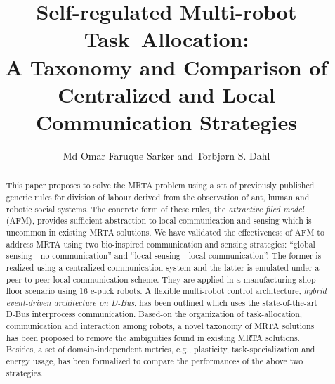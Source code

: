 \documentclass[preprint,12pt]{elsarticle}
\begin{document}
\begin{frontmatter}
\title{Self-regulated Multi-robot Task~Allocation:\\ A Taxonomy and Comparison of Centralized and Local Communication Strategies}
\author[label1]{Md Omar Faruque Sarker and Torbj{\o}rn S. Dahl}
\address[label1]{Cognitive Robotics Research Centre\\
Newport Business School,
Allt-yr-yn Campus\\ %
Newport, NP20 5DA,
United Kingdom.\\
Mdomarfaruque.Sarker \vline Torbjorn.Dahl@newport.ac.uk}
%
%
%
\begin{abstract}
This paper proposes to solve the MRTA problem using a set of previously published generic rules for division of labour derived from the observation of ant, human and robotic social systems. The concrete form of these rules, the \textit{attractive filed model} (AFM), provides sufficient abstraction to local communication and sensing which is uncommon in existing MRTA solutions. We have validated the effectiveness of AFM to address MRTA  using two bio-inspired communication and sensing strategies: ``global sensing - no communication'' and ``local sensing - local communication''. The former is realized using a centralized communication system and the latter is emulated under a peer-to-peer local communication scheme. They are applied in a  manufacturing shop-floor scenario using 16 e-puck robots. A flexible multi-robot control architecture, \textit{hybrid event-driven architecture on D-Bus}, has been outlined which uses the state-of-the-art D-Bus interprocess communication.  Based-on the organization of task-allocation, communication and interaction among robots, a  novel taxonomy of MRTA solutions has been proposed to remove the ambiguities found in existing MRTA solutions. Besides, a set of domain-independent metrics, e.g., plasticity, task-specialization and energy usage, has been formalized to compare the performances of the above two strategies.

\end{abstract}
\end{frontmatter}
\end{document}
